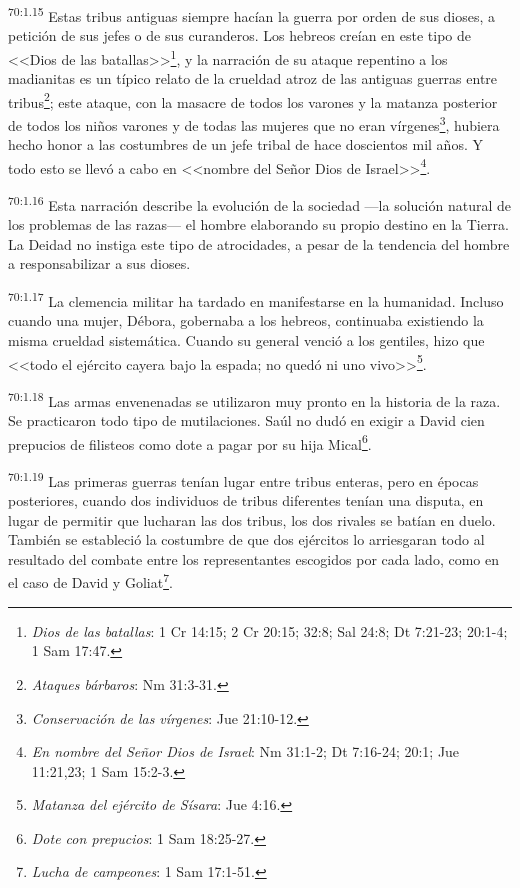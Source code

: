 \documentclass[twoside, 11pt]{book}
\begin{document}
\par
\textsuperscript{70:1.15} Estas tribus antiguas siempre hacían la guerra por orden de sus dioses, a petición de sus jefes o de sus curanderos. Los hebreos creían en este tipo de <<Dios de las batallas>>\footnote{\textit{Dios de las batallas}: 1 Cr 14:15; 2 Cr 20:15; 32:8; Sal 24:8; Dt 7:21-23; 20:1-4; 1 Sam 17:47.}, y la narración de su ataque repentino a los madianitas es un típico relato de la crueldad atroz de las antiguas guerras entre tribus\footnote{\textit{Ataques bárbaros}: Nm 31:3-31.}; este ataque, con la masacre de todos los varones y la matanza posterior de todos los niños varones y de todas las mujeres que no eran vírgenes\footnote{\textit{Conservación de las vírgenes}: Jue 21:10-12.}, hubiera hecho honor a las costumbres de un jefe tribal de hace doscientos mil años. Y todo esto se llevó a cabo en <<nombre del Señor Dios de Israel>>\footnote{\textit{En nombre del Señor Dios de Israel}: Nm 31:1-2; Dt 7:16-24; 20:1; Jue 11:21,23; 1 Sam 15:2-3.}.

\par
\textsuperscript{70:1.16} Esta narración describe la evolución de la sociedad ---la solución natural de los problemas de las razas--- el hombre elaborando su propio destino en la Tierra. La Deidad no instiga este tipo de atrocidades, a pesar de la tendencia del hombre a responsabilizar a sus dioses.

\par
\textsuperscript{70:1.17} La clemencia militar ha tardado en manifestarse en la humanidad. Incluso cuando una mujer, Débora, gobernaba a los hebreos, continuaba existiendo la misma crueldad sistemática. Cuando su general venció a los gentiles, hizo que <<todo el ejército cayera bajo la espada; no quedó ni uno vivo>>\footnote{\textit{Matanza del ejército de Sísara}: Jue 4:16.}.

\par
\textsuperscript{70:1.18} Las armas envenenadas se utilizaron muy pronto en la historia de la raza. Se practicaron todo tipo de mutilaciones. Saúl no dudó en exigir a David cien prepucios de filisteos como dote a pagar por su hija Mical\footnote{\textit{Dote con prepucios}: 1 Sam 18:25-27.}.

\par
\textsuperscript{70:1.19} Las primeras guerras tenían lugar entre tribus enteras, pero en épocas posteriores, cuando dos individuos de tribus diferentes tenían una disputa, en lugar de permitir que lucharan las dos tribus, los dos rivales se batían en duelo. También se estableció la costumbre de que dos ejércitos lo arriesgaran todo al resultado del combate entre los representantes escogidos por cada lado, como en el caso de David y Goliat\footnote{\textit{Lucha de campeones}: 1 Sam 17:1-51.}.
\end{document}
